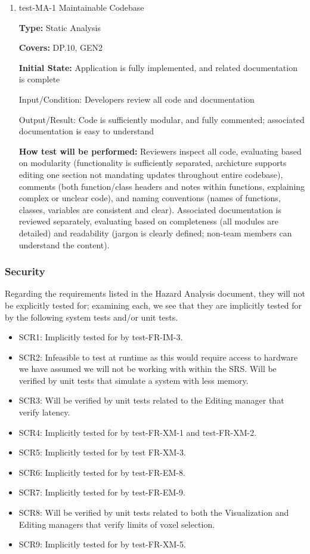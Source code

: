 \documentclass[12pt, titlepage]{article}
\begin{document}
\begin{enumerate}

\item{test-MA-1 Maintainable Codebase\\}
\label{sec:t-nf-14}

\textbf{Type:} Static Analysis

\textbf{Covers:} DP.10, GEN2
					
\textbf{Initial State:} Application is fully implemented, and related documentation is complete
					
Input/Condition: Developers review all code and documentation
					
Output/Result: Code is sufficiently modular, and fully commented; associated documentation is easy to understand
					
\textbf{How test will be performed:} Reviewers inspect all code, evaluating based on modularity (functionality is sufficiently separated,
archicture supports editing one section not mandating updates throughout entire codebase), comments (both function/class headers and notes 
within functions, explaining complex or unclear code), and naming conventions (names of functions, classes, variables are consistent
and clear). Associated documentation is reviewed separately, evaluating based on completeness (all modules are detailed) and readability
(jargon is clearly defined; non-team members can understand the content).

\end{enumerate}

\subsubsection{Security}

Regarding the requirements listed in the Hazard Analysis document, they will not be explicitly tested for; examining each, we see that they
are implicitly tested for by the following system tests and/or unit tests.

\begin{itemize}
  \item SCR1: Implicitly tested for by test-FR-IM-3.
  \item SCR2: Infeasible to test at runtime as this would require access to hardware we have assumed we will not be working with within the SRS.
  Will be verified by unit tests that simulate a system with less memory.
  \item SCR3: Will be verified by unit tests related to the Editing manager that verify latency.
  \item SCR4: Implicitly tested for by test-FR-XM-1 and test-FR-XM-2.
  \item SCR5: Implicitly tested for by test FR-XM-3.
  \item SCR6: Implicitly tested for by test-FR-EM-8.
  \item SCR7: Implicitly tested for by test-FR-EM-9.
  \item SCR8: Will be verified by unit tests related to both the Visualization and Editing managers that verify limits of voxel selection.
  \item SCR9: Implicitly tested for by test-FR-XM-5.
\end{itemize}
\end{document}
